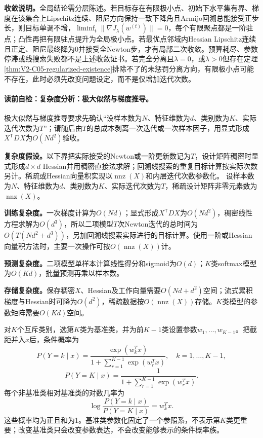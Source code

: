\label{struct:V2-C05-CH25}
\textbf{收敛说明。}全局结论需分层陈述。若目标存在有限极小点、初始下水平集有界、梯度在该集合上Lipschitz连续、阻尼方向保持一致下降角且Armijo回溯总能接受正步长，则目标单调不增，$\liminf_t\|\nabla J_\lambda(w^{(t)})\|=0$，每个有限聚点都是一阶驻点；凸性再把有限驻点提升为全局极小点。若最优点邻域内Hessian Lipschitz连续且正定、阻尼最终降为0并接受全Newton步，才有局部二次收敛。预算耗尽、参数停滞或线搜索失败都不是上述收敛证书。若完全分离且$\lambda=0$，或$\lambda>0$但存在定理\ref{thm:V2-C05-regularized-existence}排除不了的未惩罚分离方向，有限极小点可能不存在，此时必须先改变问题设定，而不是仅增加迭代次数。

\label{struct:V2-C05-CH26}
\label{struct:V2-C05-CH27}
\paragraph{读前自检：复杂度分析：极大似然与梯度推导。}极大似然与梯度推导要求先确认“设样本数为$N$、特征维数为$d$、类别数为$K$、实际迭代次数为$T$”；请随后由$T$的总成本剥离一次迭代或一次样本因子，用显式形成$X^{\mathsf T}DX$为$O(Nd^2)$验收。\par

\begin{complexitybox}
\textbf{复杂度假设。}以下界把实际接受的Newton或一阶更新数记为$T$，设计矩阵稠密时显式形成$d\times d$ Hessian并用稠密直接法求解；回溯线搜索的重复目标计算按实际次数另计。稀疏或Hessian向量积实现以$\operatorname{nnz}(X)$和内层迭代次数参数化。
设样本数为$N$、特征维数为$d$、类别数为$K$、实际迭代次数为$T$，稀疏设计矩阵非零元素数为$\operatorname{nnz}(X)$。

\textbf{训练复杂度。}一次梯度计算为$O(Nd)$；显式形成$X^{\mathsf T}DX$为$O(Nd^2)$，稠密线性方程求解为$O(d^3)$，所以二项模型$T$次Newton迭代的总时间为$O\!\left(T(Nd^2+d^3)\right)$，另加回溯线搜索实际进行的目标计算。使用一阶或Hessian向量积方法时，主要一次操作可按$O(\operatorname{nnz}(X))$计。

\textbf{预测复杂度。}二项模型单样本计算线性得分和sigmoid为$O(d)$；$K$类softmax模型为$O(Kd)$，批量预测再乘以样本数。

\textbf{存储复杂度。}保存稠密$X$、Hessian及工作向量需要$O(Nd+d^2)$空间；流式累积梯度与Hessian时可降为$O(d^2)$，稀疏数据按$O(\operatorname{nnz}(X))$存储。$K$类模型的参数矩阵需要$O(Kd)$空间。
\end{complexitybox}


对$K$个互斥类别，选第$K$类为基准类，并为前$K-1$类设置参数$w_1,\ldots,w_{K-1}$。把截距并入$x$后，条件概率为
\[
P(Y=k\mid x)=\frac{\exp(w_k^Tx)}
{1+\sum_{r=1}^{K-1}\exp(w_r^Tx)},
\quad k=1,\ldots,K-1,
\]
\[
P(Y=K\mid x)=\frac{1}
{1+\sum_{r=1}^{K-1}\exp(w_r^Tx)}.
\]
每个非基准类相对基准类的对数几率为
\[
\log\frac{P(Y=k\mid x)}{P(Y=K\mid x)}=w_k^Tx.
\]
这些概率均为正且和为1。基准类参数化固定了一个参照系，不表示第$K$类更重要；改变基准类只会改变参数表达，不会改变能够表示的条件概率族。

